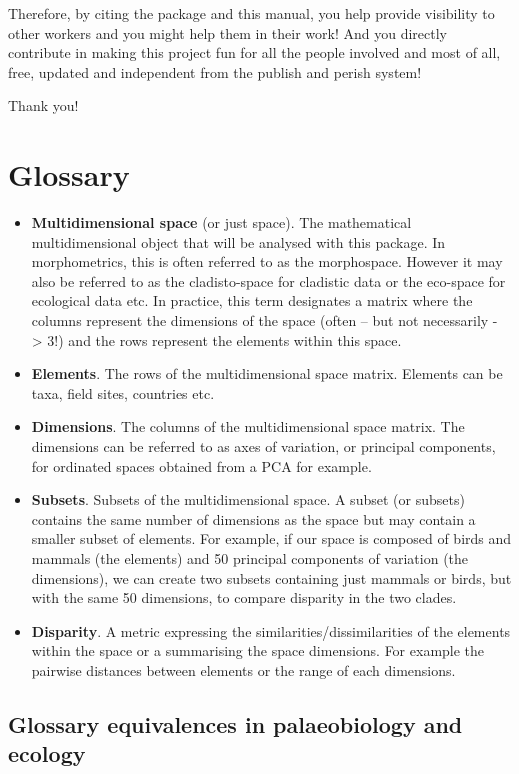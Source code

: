 \documentclass[]{book}
\begin{document}
Therefore, by citing the package and this manual, you help provide visibility to other workers and you might help them in their work!
And you directly contribute in making this project fun for all the people involved and most of all, free, updated and independent from the publish and perish system!

Thank you!

\hypertarget{glossary}{%
\chapter{Glossary}\label{glossary}}

\begin{itemize}
\item
  \textbf{Multidimensional space} (or just space). The mathematical multidimensional object that will be analysed with this package.
  In morphometrics, this is often referred to as the morphospace.
  However it may also be referred to as the cladisto-space for cladistic data or the eco-space for ecological data etc.
  In practice, this term designates a matrix where the columns represent the dimensions of the space (often -- but not necessarily - \textgreater{} 3!) and the rows represent the elements within this space.
\item
  \textbf{Elements}. The rows of the multidimensional space matrix. Elements can be taxa, field sites, countries etc.
\item
  \textbf{Dimensions}. The columns of the multidimensional space matrix. The dimensions can be referred to as axes of variation, or principal components, for ordinated spaces obtained from a PCA for example.
\item
  \textbf{Subsets}. Subsets of the multidimensional space.
  A subset (or subsets) contains the same number of dimensions as the space but may contain a smaller subset of elements.
  For example, if our space is composed of birds and mammals (the elements) and 50 principal components of variation (the dimensions), we can create two subsets containing just mammals or birds, but with the same 50 dimensions, to compare disparity in the two clades.
\item
  \textbf{Disparity}. A metric expressing the similarities/dissimilarities of the elements within the space or a summarising the space dimensions. For example the pairwise distances between elements or the range of each dimensions.
\end{itemize}

\hypertarget{glossary-equivalences-in-palaeobiology-and-ecology}{%
\section{Glossary equivalences in palaeobiology and ecology}\label{glossary-equivalences-in-palaeobiology-and-ecology}}
\end{document}
